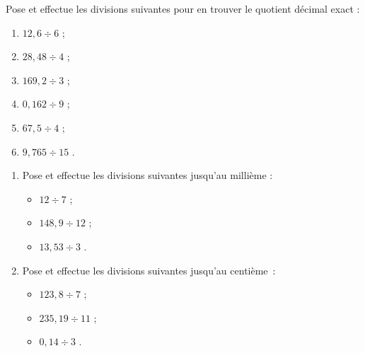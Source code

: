 \begin{exercice} 
Pose et effectue les divisions suivantes pour en trouver le quotient décimal exact :
\begin{enumerate} 
 \item $ 12,6 \div 6$ \dotfill ; 
 
 \item $ 28,48 \div 4$ \dotfill ; 

 \item $ 169,2 \div 3$ \dotfill ; 

 \item $ 0,162 \div 9$ \dotfill ; 

 \item $ 67,5 \div 4$ \dotfill ; 

 \item $ 9,765 \div 15$ \dotfill. 
 \end{enumerate}
\end{exercice}

\begin{exercice}
\vspace{-1em}
\begin{enumerate} 
 \item Pose et effectue les divisions suivantes jusqu'au millième :
 \begin{itemize}
  \item $12 \div 7$ \dotfill ; 
  
  \item $148,9 \div 12$ \dotfill ; 
  
  \item $13,53 \div 3$ \dotfill. 
  \end{itemize}
 \item Pose et effectue les divisions suivantes jusqu'au centième :
  \begin{itemize}
  \item $123,8 \div 7$ \dotfill ; 
  
  \item $235,19 \div 11$ \dotfill ; 
  
  \item $0,14 \div 3$ \dotfill. 
  \end{itemize}
 \end{enumerate}
\end{exercice}


